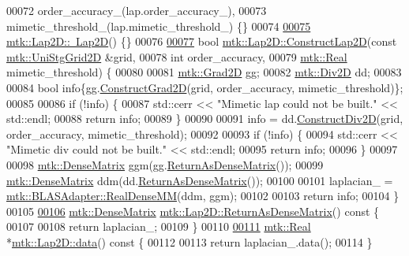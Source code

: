 \begin{DoxyCode}
00072   order\_accuracy\_(lap.order\_accuracy\_),
00073   mimetic\_threshold\_(lap.mimetic\_threshold\_) \{\}
00074 
\hypertarget{mtk__lap__2d_8cc_source_l00075}{}\hyperlink{classmtk_1_1Lap2D_a8ca8447a4da7a5ddcf826486992374a5}{00075} \hyperlink{classmtk_1_1Lap2D_a8ca8447a4da7a5ddcf826486992374a5}{mtk::Lap2D::~Lap2D}() \{\}
00076 
\hypertarget{mtk__lap__2d_8cc_source_l00077}{}\hyperlink{classmtk_1_1Lap2D_a188ee8fee643463affca7de2884711b1}{00077} \textcolor{keywordtype}{bool} \hyperlink{classmtk_1_1Lap2D_a188ee8fee643463affca7de2884711b1}{mtk::Lap2D::ConstructLap2D}(\textcolor{keyword}{const} 
      \hyperlink{classmtk_1_1UniStgGrid2D}{mtk::UniStgGrid2D} &grid,
00078                                 \textcolor{keywordtype}{int} order\_accuracy,
00079                                 \hyperlink{group__c01-roots_gac080bbbf5cbb5502c9f00405f894857d}{mtk::Real} mimetic\_threshold) \{
00080 
00081   \hyperlink{classmtk_1_1Grad2D}{mtk::Grad2D} gg;
00082   \hyperlink{classmtk_1_1Div2D}{mtk::Div2D} dd;
00083 
00084   \textcolor{keywordtype}{bool} info\{gg.\hyperlink{classmtk_1_1Grad2D_a9771be954c59880e3d83f4d645378c00}{ConstructGrad2D}(grid, order\_accuracy, mimetic\_threshold)\};
00085 
00086   \textcolor{keywordflow}{if} (!info) \{
00087     std::cerr << \textcolor{stringliteral}{"Mimetic lap could not be built."} << std::endl;
00088     \textcolor{keywordflow}{return} info;
00089   \}
00090 
00091   info = dd.\hyperlink{classmtk_1_1Div2D_a4214055909a6b94fcb9d657cc839055f}{ConstructDiv2D}(grid, order\_accuracy, mimetic\_threshold);
00092 
00093   \textcolor{keywordflow}{if} (!info) \{
00094     std::cerr << \textcolor{stringliteral}{"Mimetic div could not be built."} << std::endl;
00095     \textcolor{keywordflow}{return} info;
00096   \}
00097 
00098   \hyperlink{classmtk_1_1DenseMatrix}{mtk::DenseMatrix} ggm(gg.\hyperlink{classmtk_1_1Grad2D_a4f5a17519455f833bb70b8434c272312}{ReturnAsDenseMatrix}());
00099   \hyperlink{classmtk_1_1DenseMatrix}{mtk::DenseMatrix} ddm(dd.\hyperlink{classmtk_1_1Div2D_ae4f880fb28ad2379906e9ac0dfaa4458}{ReturnAsDenseMatrix}());
00100 
00101   laplacian\_ = \hyperlink{classmtk_1_1BLASAdapter_acebd0e9bfe0bdd609c7fbea98ccfd3b5}{mtk::BLASAdapter::RealDenseMM}(ddm, ggm);
00102 
00103   \textcolor{keywordflow}{return} info;
00104 \}
00105 
\hypertarget{mtk__lap__2d_8cc_source_l00106}{}\hyperlink{classmtk_1_1Lap2D_aaac0a22eaa2f036869b24fd420ce5761}{00106} \hyperlink{classmtk_1_1DenseMatrix}{mtk::DenseMatrix} \hyperlink{classmtk_1_1Lap2D_aaac0a22eaa2f036869b24fd420ce5761}{mtk::Lap2D::ReturnAsDenseMatrix}()\textcolor{keyword}{ const }\{
00107 
00108   \textcolor{keywordflow}{return} laplacian\_;
00109 \}
00110 
\hypertarget{mtk__lap__2d_8cc_source_l00111}{}\hyperlink{classmtk_1_1Lap2D_a102427355df09c2aad400c6ce18e5636}{00111} \hyperlink{group__c01-roots_gac080bbbf5cbb5502c9f00405f894857d}{mtk::Real} *\hyperlink{classmtk_1_1Lap2D_a102427355df09c2aad400c6ce18e5636}{mtk::Lap2D::data}()\textcolor{keyword}{ const }\{
00112 
00113   \textcolor{keywordflow}{return} laplacian\_.data();
00114 \}
\end{DoxyCode}
